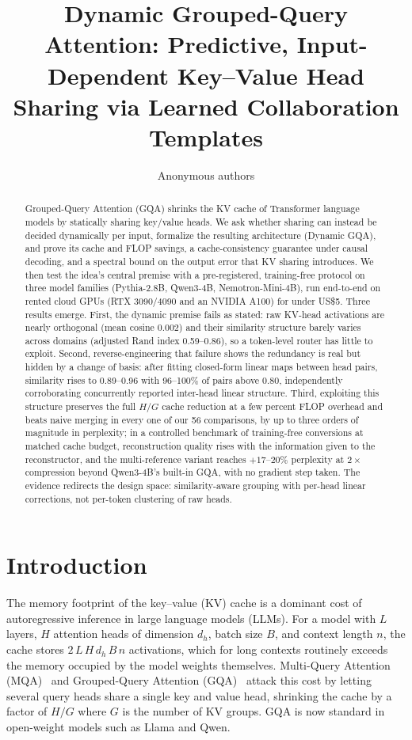 \documentclass{article}
\title{Dynamic Grouped-Query Attention: Predictive, Input-Dependent
Key--Value Head Sharing via Learned Collaboration Templates}
\author{Anonymous authors}
\begin{document}
\maketitle

\begin{abstract}
Grouped-Query Attention (GQA) shrinks the KV cache of Transformer language
models by statically sharing key/value heads. We ask whether sharing can
instead be decided dynamically per input, formalize the resulting
architecture (Dynamic GQA), and prove its cache and FLOP savings, a
cache-consistency guarantee under causal decoding, and a spectral bound on
the output error that KV sharing introduces. We then test the idea's central
premise with a pre-registered, training-free protocol on three model
families (Pythia-2.8B, Qwen3-4B, Nemotron-Mini-4B), run end-to-end on
rented cloud GPUs (RTX 3090/4090 and an NVIDIA A100) for under US\$5.
Three results emerge. First, the dynamic premise fails as stated: raw
KV-head activations are nearly orthogonal (mean cosine 0.002) and their
similarity structure barely varies across domains (adjusted Rand index
0.59--0.86), so a token-level router has little to exploit. Second,
reverse-engineering that failure shows the redundancy is real but hidden by
a change of basis: after fitting closed-form linear maps between head
pairs, similarity rises to 0.89--0.96 with 96--100\% of pairs above 0.80,
independently corroborating concurrently reported inter-head linear
structure. Third, exploiting this structure preserves the full $H/G$ cache
reduction at a few percent FLOP overhead and beats naive merging in every
one of our 56 comparisons, by up to three orders of magnitude in
perplexity; in a controlled benchmark of training-free conversions at
matched cache budget, reconstruction quality rises with the information
given to the reconstructor, and the multi-reference variant reaches
$+17$--$20\%$ perplexity at $2\times$ compression beyond Qwen3-4B's
built-in GQA, with no gradient step taken. The evidence redirects the
design space: similarity-aware grouping with per-head linear corrections,
not per-token clustering of raw heads.
\end{abstract}

\section{Introduction}
\label{sec:intro}

The memory footprint of the key--value (KV) cache is a dominant cost of
autoregressive inference in large language models (LLMs). For a model with
$L$ layers, $H$ attention heads of dimension $d_h$, batch size $B$, and
context length $n$, the cache stores $2\,L\,H\,d_h\,B\,n$ activations, which
for long contexts routinely exceeds the memory occupied by the model weights
themselves. Multi-Query Attention (MQA)~\citep{shazeer2019fast} and
Grouped-Query Attention (GQA)~\citep{ainslie2023gqa} attack this cost by
letting several query heads share a single key and value head, shrinking the
cache by a factor of $H/G$ where $G$ is the number of KV groups. GQA is now
standard in open-weight models such as Llama and Qwen.
\end{document}
